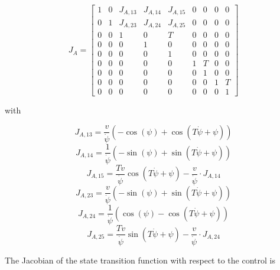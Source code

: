 \documentclass[conference]{IEEEtran}
\begin{document}
\begin{equation}
J_A=\left[\begin{matrix}1 & 0 & J_{A,13} & J_{A,14} & J_{A,15} & 0 & 0 & 0 & 0\\0 & 1 & J_{A,23} & J_{A,24} & J_{A,25} & 0 & 0 & 0 & 0\\0 & 0 & 1 & 0 & T & 0 & 0 & 0 & 0\\0 & 0 & 0 & 1 & 0 & 0 & 0 & 0 & 0\\0 & 0 & 0 & 0 & 1 & 0 & 0 & 0 & 0\\0 & 0 & 0 & 0 & 0 & 1 & T & 0 & 0\\0 & 0 & 0 & 0 & 0 & 0 & 1 & 0 & 0\\0 & 0 & 0 & 0 & 0 & 0 & 0 & 1 & T\\0 & 0 & 0 & 0 & 0 & 0 & 0 & 0 & 1\end{matrix}\right]
\end{equation}

with

\begin{equation}J_{A,13}=\frac{v}{\dot\psi} \left(- \cos{\left (\psi \right )} + \cos{\left (T \dot\psi + \psi \right )}\right)\end{equation}
\begin{equation}J_{A,14}=\frac{1}{\dot\psi} \left(- \sin{\left (\psi \right )} + \sin{\left (T \dot\psi + \psi \right )}\right)\end{equation}
\begin{equation}J_{A,15}=\frac{T v}{\dot\psi} \cos{\left (T \dot\psi + \psi \right )} - \frac{v}{\dot\psi} \cdot J_{A,14}\end{equation}
\begin{equation}J_{A,23}=\frac{v}{\dot\psi} \left(- \sin{\left (\psi \right )} + \sin{\left (T \dot\psi + \psi \right )}\right)\end{equation}
\begin{equation}J_{A,24}=\frac{1}{\dot\psi} \left(\cos{\left (\psi \right )} - \cos{\left (T \dot\psi + \psi \right )}\right)\end{equation}
\begin{equation}J_{A,25}=\frac{T v}{\dot\psi} \sin{\left (T \dot\psi + \psi \right )} - \frac{v}{\dot\psi}\cdot J_{A,24}\end{equation}

The Jacobian of the state transition function with respect to the control is
\end{document}
